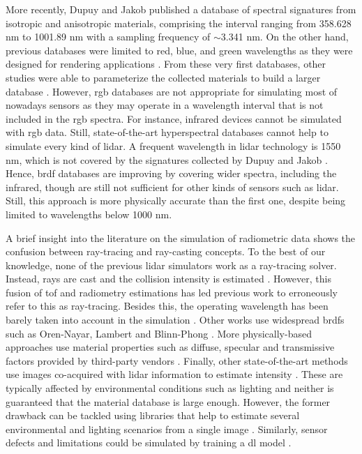 More recently, Dupuy and Jakob \cite{dupuy_adaptive_2018} published a database of spectral signatures from isotropic and anisotropic materials, comprising the interval ranging from 358.628 \si{\nano\meter} to 1001.89 \si{\nano\meter} with a sampling frequency of $\sim$3.341 \si{\nano\meter}. On the other hand, previous databases were limited to red, blue, and green wavelengths as they were designed for rendering applications \cite{matusik_data-driven_2003}. From these very first databases, other studies were able to parameterize the collected materials to build a larger database \cite{serrano_intuitive_2016}. However, \acrshort{rgb} databases are not appropriate for simulating most of nowadays sensors as they may operate in a wavelength interval that is not included in the \acrshort{rgb} spectra. For instance, infrared devices cannot be simulated with \acrshort{rgb} data. Still, state-of-the-art hyperspectral databases cannot help to simulate every kind of \acrshort{lidar}. A frequent wavelength in \acrshort{lidar} technology is 1550 \si{\nano\meter}, which is not covered by the signatures collected by Dupuy and Jakob \cite{dupuy_adaptive_2018}. Hence, \acrshort{brdf} databases are improving by covering wider spectra, including the infrared, though are still not sufficient for other kinds of sensors such as \acrshort{lidar}. Still, this approach is more physically accurate than the first one, despite being limited to wavelengths below 1000 \si{\nano\meter}.

A brief insight into the literature on the simulation of radiometric data shows the confusion between ray-tracing and ray-casting concepts. To the best of our knowledge, none of the previous \acrshort{lidar} simulators work as a ray-tracing solver. Instead, rays are cast and the collision intensity is estimated \cite{ahn_real-time_2020, zhao_method_2021, bechtold_helios_2016}. However, this fusion of \acrshort{tof} and radiometry estimations has led previous work to erroneously refer to this as ray-tracing. Besides this, the operating wavelength has been barely taken into account in the simulation \cite{chen_analysis_2022, gschwandtner_blensor_2011, zohdi_rapid_2020}. Other works use widespread \acrshort{brdf}s such as Oren-Nayar, Lambert and Blinn-Phong \cite{chen_analysis_2022}. More physically-based approaches use material properties such as diffuse, specular and transmissive factors provided by third-party vendors \cite{haider_development_2022}. Finally, other state-of-the-art methods use images co-acquired with \acrshort{lidar} information to estimate intensity \cite{vacek_learning_2022, xiao_synlidar_2021}. These are typically affected by environmental conditions such as lighting and neither is guaranteed that the material database is large enough. However, the former drawback can be tackled using libraries that help to estimate several environmental and lighting scenarios from a single image \cite{buslaev_albumentations_2020}. Similarly, sensor defects and limitations could be simulated by training a \acrshort{dl} model \cite{guillard_learning_2022}.  
